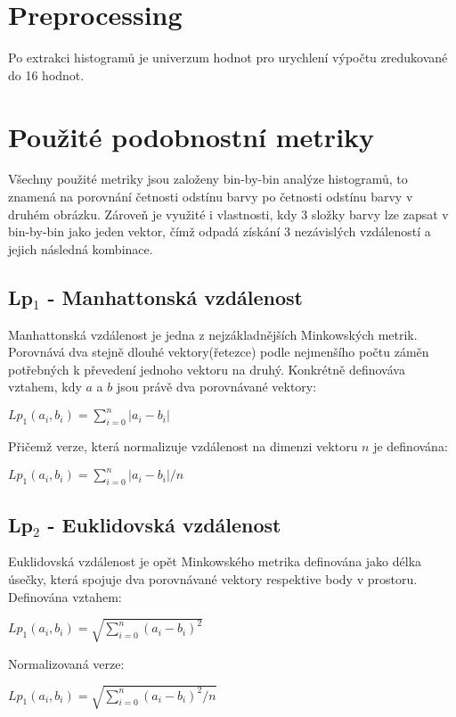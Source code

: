 \documentclass{report}
\begin{document}
\section{Preprocessing}
	Po extrakci histogramů je univerzum hodnot pro urychlení výpočtu zredukované do 16 hodnot.

\section{Použité podobnostní metriky}
	Všechny použité metriky jsou založeny bin-by-bin analýze histogramů, to znamená na porovnání četnosti odstínu barvy po četnosti odstínu barvy v druhém obrázku. Zároveň je využité i vlastnosti, kdy 3 složky barvy lze zapsat v bin-by-bin jako jeden vektor, čímž odpadá získání 3 nezávislých vzdáleností a jejich následná kombinace.
	\subsection{Lp$_1$ - Manhattonská vzdálenost}
	Manhattonská vzdálenost je jedna z nejzákladnějších Minkowských metrik. Porovnává dva stejně dlouhé vektory(řetezce) podle nejmenšího počtu záměn potřebných k převedení jednoho vektoru na druhý. Konkrétně definováva vztahem, kdy $a$ a $b$ jsou právě dva porovnávané vektory:
	\begin{center}
		$Lp_1(a_i,b_i) = \sum_{i=0}^n |a_i-b_i|$
	\end{center}

	Přičemž verze, která normalizuje vzdálenost na dimenzi vektoru $n$ je definována:

	\begin{center}
		$Lp_1(a_i,b_i) = \sum_{i=0}^n |a_i-b_i|/n$
	\end{center}

	\subsection{Lp$_2$ - Euklidovská vzdálenost}
	Euklidovská vzdálenost je opět Minkowského metrika definována jako délka úsečky, která spojuje dva porovnávané vektory respektive body v prostoru. Definována vztahem:

	\begin{center}
		$Lp_1(a_i,b_i) = \sqrt{\sum_{i=0}^n (a_i-b_i)^2}$
	\end{center}

	Normalizovaná verze:
	\begin{center}
		$Lp_1(a_i,b_i) = \sqrt{\sum_{i=0}^n (a_i-b_i)^2/n}$
	\end{center}
\end{document}
